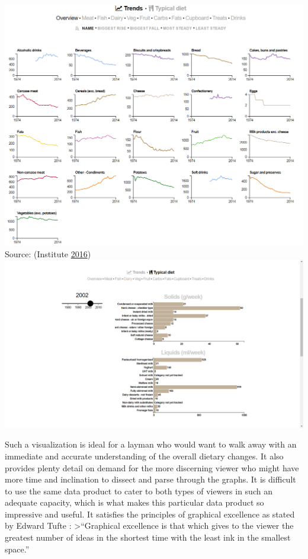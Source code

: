 \documentclass[]{book}
\begin{document}
\includegraphics{images/britain-diet-data-trends.PNG} Source: (Institute
\protect\hyperlink{ref-britain_diet_2016}{2016})
\includegraphics{images/britain-diet-data-typical_diet.png}

Such a visualization is ideal for a layman who would want to walk away
with an immediate and accurate understanding of the overall dietary
changes. It also provides plenty detail on demand for the more
discerning viewer who might have more time and inclination to dissect
and parse through the graphs. It is difficult to use the same data
product to cater to both types of viewers in such an adequate capacity,
which is what makes this particular data product so impressive and
useful. It satisfies the principles of graphical excellence as stated by
Edward Tufte : \textgreater{}``Graphical excellence is that which gives
to the viewer the greatest number of ideas in the shortest time with the
least ink in the smallest space.''
\end{document}
